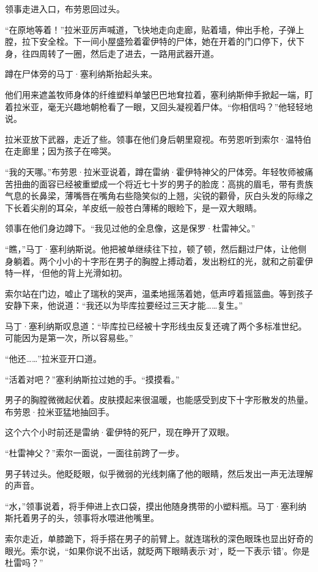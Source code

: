 \documentclass[AutoFakeBold=true]{book}
\begin{document}
领事走进入口，布劳恩回过头。

``在原地等着！''拉米亚厉声喊道，飞快地走向走廊，贴着墙，伸出手枪，子弹上膛，拉下安全栓。下一间小屋盛殓着霍伊特的尸体，她在开着的门口停下，伏下身，往四周转了一圈，然后走了进去，一路用武器开道。

蹲在尸体旁的马丁·塞利纳斯抬起头来。

他们用来遮盖牧师身体的纤维塑料单皱巴巴地耷拉着，塞利纳斯伸手掀起一端，盯着拉米亚，毫无兴趣地朝枪看了一眼，又回头凝视着尸体。``你相信吗？''他轻轻地说。

拉米亚放下武器，走近了些。领事在他们身后朝里窥视。布劳恩听到索尔·温特伯在走廊里；因为孩子在啼哭。

``我的天哪。''布劳恩·拉米亚说着，蹲在雷纳·霍伊特神父的尸体旁。年轻牧师被痛苦扭曲的面容已经被重塑成一个将近七十岁的男子的脸庞：高挑的眉毛，带有贵族气息的长鼻梁，薄嘴唇在嘴角右些隐笑似的上翘，尖锐的颧骨，灰白头发的际缘之下长着尖削的耳朵，羊皮纸一般苍白薄稀的眼睑下，是一双大眼睛。

领事在他们身边蹲下。``我见过他的全息像，这是保罗·杜雷神父。''

``瞧，''马丁·塞利纳斯说。他把被单继续往下拉，顿了顿，然后翻过尸体，让他侧身躺着。两个小小的十字形在男子的胸膛上搏动着，发出粉红的光，就和之前霍伊特一样，`但他的背上光滑如初。

索尔站在门边，嘘止了瑞秋的哭声，温柔地摇荡着她，低声哼着摇篮曲。等到孩子安静下来，他说道：``我还以为毕库拉要经过三天才能……复生。''

马丁·塞利纳斯叹息道：``毕库拉已经被十字形线虫反复还魂了两个多标准世纪。可能因为是第一次，所以容易些。''

``他还……''拉米亚开口道。

``活着对吧？''塞利纳斯拉过她的手。``摸摸看。''

男子的胸膛微微起伏着。皮肤摸起来很温暖，也能感受到皮下十字形散发的热量。布劳恩·拉米亚猛地抽回手。

这个六个小时前还是雷纳·霍伊特的死尸，现在睁开了双眼。

``杜雷神父？''索尔一面说，一面往前跨了一步。

男子转过头。他眨眨眼，似乎微弱的光线刺痛了他的眼睛，然后发出一声无法理解的声音。

``水，''领事说着，将手伸进上衣口袋，摸出他随身携带的小塑料瓶。马丁·塞利纳斯托着男子的头，领事将水喂进他嘴里。

索尔走近，单膝跪下，将手搭在男子的前臂上。就连瑞秋的深色眼珠也显出好奇的眼光。索尔说，``如果你说不出话，就眨两下眼睛表示`对'，眨一下表示`错'。你是杜雷吗？''
\end{document}
